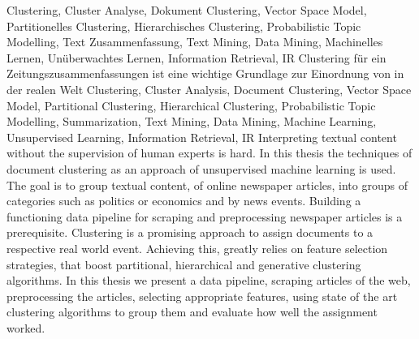 \HAWAbstractPage
  {
    Clustering, 
    Cluster Analyse, 
    Dokument Clustering, Vector Space Model,
    Partitionelles Clustering,
    Hierarchisches Clustering,
    Probabilistic Topic Modelling, 
    Text Zusammenfassung,
    Text Mining, Data Mining,
    Machinelles Lernen, Unüberwachtes Lernen, 
    Information Retrieval, IR
  }
  { 
    Clustering für ein Zeitungszusammenfassungen ist eine wichtige Grundlage zur Einordnung von in der realen Welt
  }
  { 
    Clustering, 
    Cluster Analysis, 
    Document Clustering, Vector Space Model,
    Partitional Clustering,
    Hierarchical Clustering,
    Probabilistic Topic Modelling,
    Summarization,
    Text Mining, Data Mining,
    Machine Learning, Unsupervised Learning, 
    Information Retrieval, IR
  }
  {
    Interpreting textual content without the supervision of human experts is hard. In this thesis the techniques of document clustering as an approach of unsupervised machine learning is used. The goal is to group textual content, of online newspaper articles, into groups of categories such as politics or economics and by news events. Building a functioning data pipeline for scraping and preprocessing newspaper articles is a prerequisite. Clustering is a promising approach to assign documents to a respective real world event. Achieving this, greatly relies on feature selection strategies, that boost partitional, hierarchical and generative clustering algorithms. In this thesis we present a data pipeline, scraping articles of the web, preprocessing the articles, selecting appropriate features, using state of the art clustering algorithms to group them and evaluate how well the assignment worked.
  }
